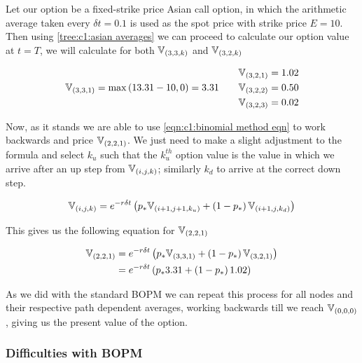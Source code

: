 Let our option be a fixed-strike price Asian call option, in which the arithmetic average taken every \(\delta t = 0.1\) is used as the spot price with strike price \(E = 10\). Then using \autoref{tree:c1:asian averages} we can proceed to calculate our option value at \(t = T\), we will calculate for both \(\mathbb{V}_{\left(3,3,k\right)}\) and \(\mathbb{V}_{\left(3,2,k\right)}\)

\begin{align*}
    \begin{split}
        \mathbb{V}_{\left(3,3,1\right)} &= \max\left(13.31-10,0\right) = 3.31
    \end{split}
    &&
    \begin{split}
        \mathbb{V}_{\left(3,2,1\right)} &= 1.02 \\
        \mathbb{V}_{\left(3,2,2\right)} &= 0.50 \\
        \mathbb{V}_{\left(3,2,3\right)} &= 0.02 \\
    \end{split}
\end{align*}

Now, as it stands we are able to use \autoref{eqn:c1:binomial method eqn} to work backwards and price \(\mathbb{V}_{\left(2,2,1\right)}\). We just need to make a slight adjustment to the formula and select \(k_u\) such that the \(k_u^{th}\) option value is the value in which we arrive after an up step from \(\mathbb{V}_{\left(i,j,k\right)}\); similarly \(k_d\) to arrive at the correct down step.

\begin{equation}\label{eqn:asian binomial eqn}
    \mathbb{V}_{\left(i,j,k\right)} = e^{-r\delta t}\left(p_*\mathbb{V}_{\left(i+1,j+1,k_u\right)} + \left(1-p_*\right)\mathbb{V}_{\left(i+1,j,k_d\right)}\right)
\end{equation}

This gives us the following equation for \(\mathbb{V}_{\left(2,2,1\right)}\)

\begin{align*}
    \mathbb{V}_{\left(2,2,1\right)} &= e^{-r\delta t}\left(p_*\mathbb{V}_{\left(3,3,1\right)} + \left(1-p_*\right)\mathbb{V}_{\left(3,2,1\right)}\right) \\
    &= e^{-r\delta t}\left(p_*3.31 + \left(1-p_*\right)1.02\right)
\end{align*}

As we did with the standard BOPM we can repeat this process for all nodes and their respective path dependent averages, working backwards till we reach \(\mathbb{V}_{\left(0,0,0\right)}\), giving us the present value of the option.

\subsubsection{Difficulties with BOPM}

